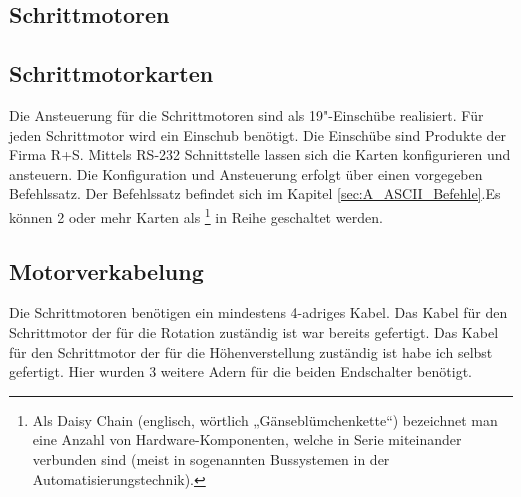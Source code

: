 \subsection{Schrittmotoren}
\subsection{Schrittmotorkarten}
Die Ansteuerung für die Schrittmotoren sind als 19"-Einschübe realisiert. Für jeden Schrittmotor wird ein Einschub benötigt.
Die Einschübe sind Produkte der Firma R+S. Mittels RS-232 Schnittstelle lassen sich die Karten konfigurieren und ansteuern. Die Konfiguration und Ansteuerung erfolgt über einen vorgegeben 
 Befehlssatz. Der Befehlssatz befindet sich im Kapitel \ref{sec:A_ASCII_Befehle}.Es können 2 oder mehr Karten als 
\footnote{Als Daisy Chain (englisch, wörtlich „Gänseblümchenkette“) bezeichnet man eine Anzahl von Hardware-Komponenten, welche in Serie miteinander verbunden sind (meist in sogenannten Bussystemen in der Automatisierungstechnik).\cite{wiki:Daisy} } 
in Reihe geschaltet werden.
\subsection{Motorverkabelung}
Die Schrittmotoren benötigen ein mindestens 4-adriges Kabel. Das Kabel für den Schrittmotor der für die Rotation zuständig ist war bereits gefertigt. Das Kabel für den Schrittmotor der für die Höhenverstellung zuständig ist habe ich selbst gefertigt. Hier wurden 3 weitere Adern für die beiden Endschalter benötigt.
